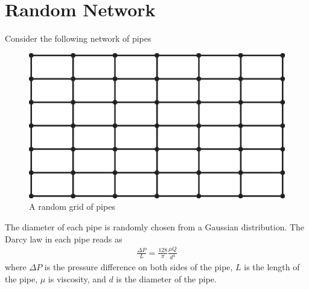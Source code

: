 \section{Random Network}
%
Consider the following network of pipes
%
\begin{figure}[h]
  \centering
  \includegraphics[width=12cm]{./grid.eps}
  \caption{A random grid of pipes} \label{fig-grid}
\end{figure}
%
The diameter of each pipe is randomly chosen from a Gaussian
distribution. The Darcy law in each pipe reads as
%
\begin{align}
  \frac{\Delta P}{L}  = \frac{128}{\pi} \frac{\mu Q}{d^4} 
\end{align}
%
where $\Delta P$ is the pressure difference on both sides of the pipe,
$L$ is the length of the pipe, $\mu$ is viscosity, and $d$ is the
diameter of the pipe. 














\small{
}


